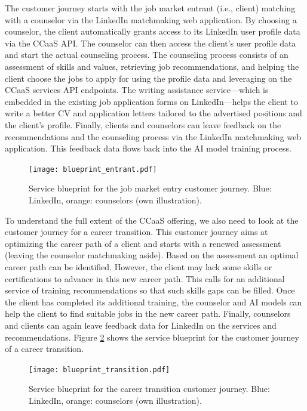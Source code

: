 The customer journey starts with the job market entrant (i.e., client) matching with a counselor
via the LinkedIn matchmaking web application. By choosing a counselor, the client automatically
grants access to its LinkedIn user profile data via the CCaaS API. The counselor can then access
the client's user profile data and start the actual counseling process. The counseling process
consists of an assessment of skills and values, retrieving job recommendations, and helping the
client choose the jobs to apply for using the profile data and leveraging on the CCaaS services
API endpoints. The writing assistance service---which is embedded in the existing job application
forms on LinkedIn---helps the client to write a better CV and application letters tailored to the
advertised positions and the client's profile. Finally, clients and counselors can leave feedback
on the recommendations and the counseling process via the LinkedIn matchmaking web application.
This feedback data flows back into the AI model training process.

\begin{figure}[h!]
    \centering
    \caption{Service blueprint for the job market entry customer journey. Blue: LinkedIn, orange: counselors (own illustration).}
    \label{fig:blueprint_entrant}
    \texttt{[image: blueprint\_entrant.pdf]}
\end{figure}

To understand the full extent of the CCaaS offering, we also need to look at the customer journey
for a career transition. This customer journey aims at optimizing the career path of a client and
starts with a renewed assessment (leaving the counselor matchmaking aside). Based on the assessment
an optimal career path can be identified. However, the client may lack some skills or certifications
to advance in this new career path. This calls for an additional service of training recommendations
so that such skills gaps can be filled. Once the client has completed its additional training, the
counselor and AI models can help the client to find suitable jobs in the new career path. Finally,
counselors and clients can again leave feedback data for LinkedIn on the services and recommendations.
Figure \ref{fig:blueprint_transition} shows the service blueprint for the customer journey of a 
career transition.

\begin{figure}[h!]
    \centering
    \caption{Service blueprint for the career transition customer journey. Blue: LinkedIn, orange: counselors (own illustration).}
    \label{fig:blueprint_transition}
    \texttt{[image: blueprint\_transition.pdf]}
\end{figure}


